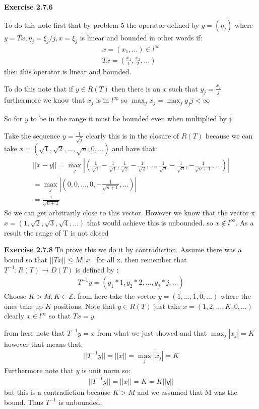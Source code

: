 \documentclass[12pt]{article}
\newcommand{\Z}{\mathbb{Z}}
\newenvironment{exercise}[1]{\vspace{.1in}\noindent\textbf{Exercise #1 \hspace{.05em}}}{}
\theoremstyle{definition}
\theoremstyle{remark}
\begin{document}
\begin{exercise}{2.7.6}

	To do this note first that by problem 5 the operator defined by $y=(\eta_j)$ where $y=Tx,\eta_j=\xi_j/j,x=\xi_j$ is linear and bounded in other words if:
	\begin{align}
		x=(x_1,\dots)\in l^{\infty} \\
		Tx=(\frac{x_1}{1},\frac{x_2}{2},\dots)
	\end{align}
	then this operator is linear and bounded.

	To do this note that if $y\in R(T)$ then there is an $x$ such that $y_j=\frac{x_j}{j}$ furthermore we know that $x_j$ is in $l^\infty$ so $\max_j x_j=\max_jy_j j<\infty$

	So for $y$ to be in the range it must be bounded even when multiplied by j.

	Take the sequence $y=\frac{1}{\sqrt{j}}$ clearly this is in the closure of $R(T)$ because we can take $x=(\sqrt{1},\sqrt{2},\dots,\sqrt{n},0,\dots)$ and have that:
	\begin{align}
		||x-y||=\max_j|(\frac{1}{\sqrt 1}-\frac{1}{\sqrt{1}},\frac{1}{\sqrt{2}}-\frac{1}{\sqrt{2}},\dots,\frac{1}{\sqrt{n}}-\frac{1}{\sqrt{n}},-\frac{1}{\sqrt{n+1}},\dots)| \\
		=\max_j|(0,0,\dots,0,-\frac{1}{\sqrt{n+1}},\dots)|                                                                                                                   \\
		=\frac{1}{\sqrt{n+1}}
	\end{align}
	So we can get arbitrarily close to this vector. However we know that the vector x $x=(1,\sqrt{2},\sqrt{3},\sqrt{4},\dots)$ that would achieve this is unbounded. so $x\notin l^{\infty}$. As a result the range of T is not closed
\end{exercise}

\begin{exercise}{2.7.8}
	To prove this we do it by contradiction. Assume there was a bound so that $||Tx||\leq M||x||$ for all x. then remember that $T^{-1}:R(T)\rightarrow D(T)$ is defined by :
	\begin{align}
		T^{-1}y=(y_1*1,y_2*2,\dots,y_j*j,\dots)
	\end{align}
	Choose $K>M, K\in \Z$. from here take the vector $y=(1,\dots,1,0,\dots)$ where the ones take up $K$ positions. Note that $y\in R(T)$ just take $x=(1,2,\dots, K,0,\dots)$ clearly $x\in l^\infty$ so that $Tx=y$.

	from here note that $T^{-1}y=x$ from what we just showed and that $\max_j |x_j|=K$ however that means that:
	\begin{align}
		||T^{-1}y||=||x||=\max_j|x_j|=K
	\end{align}
	Furthermore note that $y$ is unit norm so:
	\begin{align}
		||T^{-1}y||=||x||=K=K||y||
	\end{align}
	but this is a contradiction because $K>M$ and we assumed that M was the bound. Thus $T^{-1}$ is unbounded.
\end{exercise}
\end{document}
